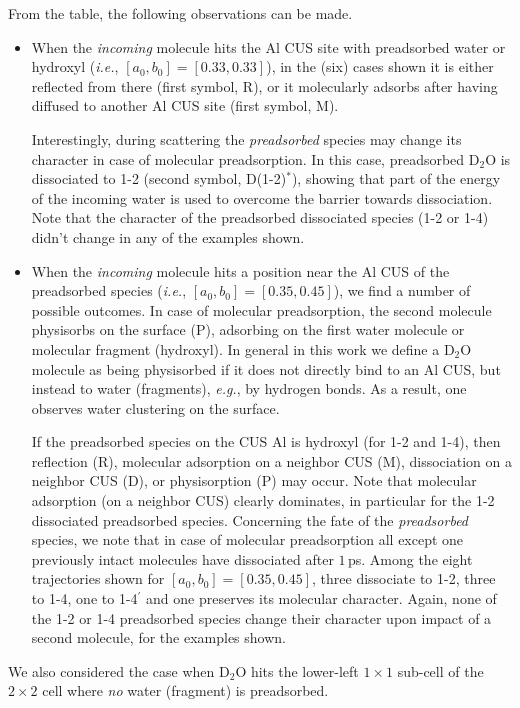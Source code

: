 \documentclass[11pt,DIV=13,BCOR=5mm,a4paper,headinclude]{scrbook}
\begin{document}
From the table, the following observations can be made. 
\begin{itemize}
\item
When the \textit{incoming} molecule hits the Al CUS site with preadsorbed water or hydroxyl (\textit{i.e.}, $[a_0,b_0]=[0.33,0.33]$), in the (six) cases shown it is either reflected from there (first symbol, R), or it molecularly adsorbs after having diffused to another Al CUS site (first symbol, M).

Interestingly, during scattering the \textit{preadsorbed} species may change its character in case of molecular preadsorption.
In this case, preadsorbed D$_2$O is dissociated to 1-2 (second symbol, D(1-2)$^*$), showing that part of the energy of the incoming water is used to overcome the barrier towards dissociation.
Note that the character of the preadsorbed dissociated species (1-2 or 1-4) didn't change in any of the examples shown.
\item  When the \textit{incoming} molecule hits a position near the Al CUS of the preadsorbed species (\textit{i.e.}, $[a_0,b_0]=[0.35,0.45]$), we find a number of possible outcomes.
In case of molecular preadsorption, the second molecule physisorbs on the surface (P), adsorbing on the first water molecule or molecular fragment (hydroxyl).
In general in this work we define a D$_2$O molecule as being physisorbed if it does not directly bind to an Al CUS, but instead to water (fragments), \textit{e.g.}, by hydrogen bonds.
As a result, one observes water clustering on the surface.

If the preadsorbed species on the CUS Al is hydroxyl (for 1-2 and 1-4), then reflection (R), molecular adsorption on a neighbor CUS (M), dissociation on a neighbor CUS (D), or physisorption (P) may occur.
Note that molecular adsorption (on a neighbor CUS) clearly dominates, in particular for the 1-2 dissociated preadsorbed species.
Concerning the fate of the \textit{preadsorbed} species, we note that in case of molecular preadsorption all except one previously intact molecules have dissociated after $1\,$ps.
Among the eight trajectories shown for $[a_0,b_0]=[0.35,0.45]$, three dissociate to 1-2, three to 1-4, one to 1-4$^\prime$ and one preserves its molecular character.
Again, none of the 1-2 or 1-4 preadsorbed species change their character upon impact of a second molecule, for the examples shown.
\end{itemize}
We also considered the case when  D$_2$O hits the lower-left $1\times 1$ sub-cell of the $2\times 2$ cell where \textit{no} water (fragment) is preadsorbed.
\end{document}
